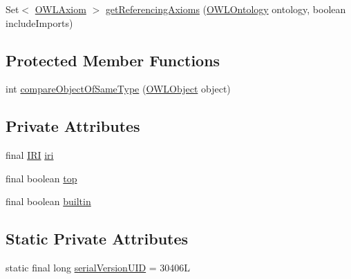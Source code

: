 \begin{DoxyCompactItemize}
\item 
Set$<$ \hyperlink{interfaceorg_1_1semanticweb_1_1owlapi_1_1model_1_1_o_w_l_axiom}{O\-W\-L\-Axiom} $>$ \hyperlink{classuk_1_1ac_1_1manchester_1_1cs_1_1owl_1_1owlapi_1_1_o_w_l_datatype_impl_a55cd7fa791c47c435a83ce2955420a73}{get\-Referencing\-Axioms} (\hyperlink{interfaceorg_1_1semanticweb_1_1owlapi_1_1model_1_1_o_w_l_ontology}{O\-W\-L\-Ontology} ontology, boolean include\-Imports)
\end{DoxyCompactItemize}
\subsection*{Protected Member Functions}
\begin{DoxyCompactItemize}
\item 
int \hyperlink{classuk_1_1ac_1_1manchester_1_1cs_1_1owl_1_1owlapi_1_1_o_w_l_datatype_impl_a5b21a9f65d51c47bd4d6451e449590cf}{compare\-Object\-Of\-Same\-Type} (\hyperlink{interfaceorg_1_1semanticweb_1_1owlapi_1_1model_1_1_o_w_l_object}{O\-W\-L\-Object} object)
\end{DoxyCompactItemize}
\subsection*{Private Attributes}
\begin{DoxyCompactItemize}
\item 
final \hyperlink{classorg_1_1semanticweb_1_1owlapi_1_1model_1_1_i_r_i}{I\-R\-I} \hyperlink{classuk_1_1ac_1_1manchester_1_1cs_1_1owl_1_1owlapi_1_1_o_w_l_datatype_impl_aa546680ee73b8b33a63671c10235b331}{iri}
\item 
final boolean \hyperlink{classuk_1_1ac_1_1manchester_1_1cs_1_1owl_1_1owlapi_1_1_o_w_l_datatype_impl_a70bc7223207e869d426f1411e6558862}{top}
\item 
final boolean \hyperlink{classuk_1_1ac_1_1manchester_1_1cs_1_1owl_1_1owlapi_1_1_o_w_l_datatype_impl_ae62575f2e1a63835962a37ae611b6ecf}{builtin}
\end{DoxyCompactItemize}
\subsection*{Static Private Attributes}
\begin{DoxyCompactItemize}
\item 
static final long \hyperlink{classuk_1_1ac_1_1manchester_1_1cs_1_1owl_1_1owlapi_1_1_o_w_l_datatype_impl_a60f3688995205331f56d74b2601e9cd9}{serial\-Version\-U\-I\-D} = 30406\-L
\end{DoxyCompactItemize}
